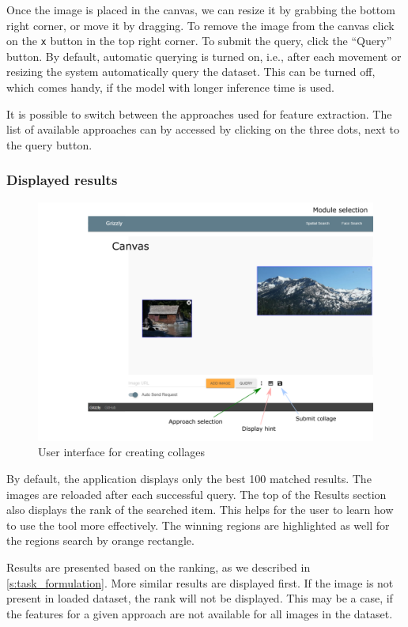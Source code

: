 Once the image is placed in the canvas, we can resize it by grabbing the bottom right corner, or move it by dragging. To remove the image from the canvas click on the \verb+x+ button in the top right corner. To submit the query, click the ``Query'' button. By default, automatic querying is turned on, i.e., after each movement or resizing the system automatically query the dataset. This can be turned off, which comes handy, if the model with longer inference time is used.

It is possible to switch between the approaches used  for feature extraction. The list of available approaches can by accessed by clicking on the three dots, next to the query button.

\subsubsection*{Displayed results}

\begin{figure}
    \includegraphics[width=0.9\linewidth]{img/spatial_ui.png}
    \caption{User interface for creating collages}
    \label{fig:ui_collage}
\end{figure}

By default, the application displays only the best 100 matched results. The images are reloaded after each successful query. The top of the Results section also displays the rank of the searched item. This helps for the user to learn how to use the tool more effectively. The winning regions are highlighted as well for the regions search by orange rectangle.

Results are presented based on the ranking, as we described in \autoref{s:task_formulation}. More similar results are displayed first. If the image is not present in loaded dataset, the rank will not be displayed. This may be a case, if the features for a given approach are not available for all images in the dataset.

